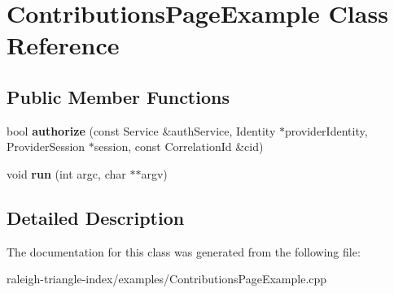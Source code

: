 \section{Contributions\+Page\+Example Class Reference}
\label{class_contributions_page_example}
\subsection*{Public Member Functions}
\begin{DoxyCompactItemize}
\item 
bool {\bfseries authorize} (const Service \&auth\+Service, Identity $\ast$provider\+Identity, Provider\+Session $\ast$session, const Correlation\+Id \&cid)\label{class_contributions_page_example_a7f5dfa971f3c7d3072a8131608374ec4}

\item 
void {\bfseries run} (int argc, char $\ast$$\ast$argv)\label{class_contributions_page_example_adc1d4a5c7fd8ca1e0bae306b343d2007}

\end{DoxyCompactItemize}


\subsection{Detailed Description}


The documentation for this class was generated from the following file\+:\begin{DoxyCompactItemize}
\item 
raleigh-\/triangle-\/index/examples/Contributions\+Page\+Example.\+cpp\end{DoxyCompactItemize}
